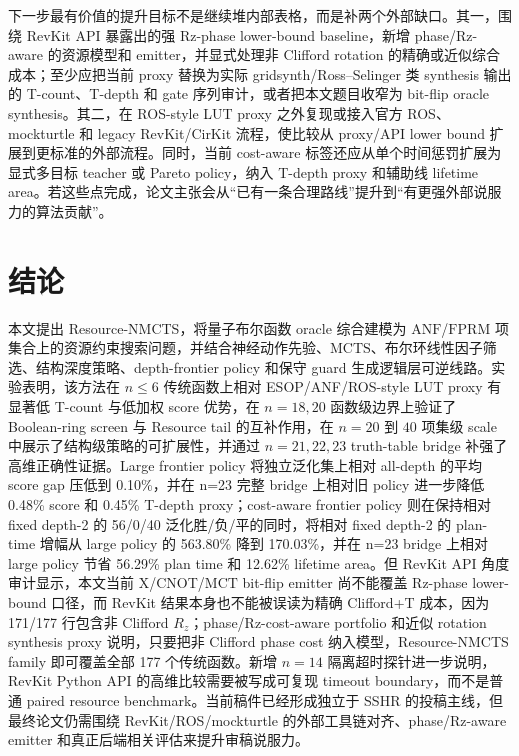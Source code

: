 \documentclass[UTF8,fontset=macnew,11pt]{ctexart}
\newcommand{\method}{Resource-NMCTS}
\newcommand{\screen}{Boolean-ring screen}
\newcommand{\anf}{\ensuremath{\mathrm{ANF}}}
\newcommand{\fprm}{\ensuremath{\mathrm{FPRM}}}
\newcommand{\mcts}{\ensuremath{\mathrm{MCTS}}}
\newcommand{\mct}{\ensuremath{\mathrm{MCT}}}
\begin{document}
下一步最有价值的提升目标不是继续堆内部表格，而是补两个外部缺口。其一，围绕 RevKit API 暴露出的强 Rz-phase lower-bound baseline，新增 phase/Rz-aware 的资源模型和 emitter，并显式处理非 Clifford rotation 的精确或近似综合成本；至少应把当前 proxy 替换为实际 gridsynth/Ross--Selinger 类 synthesis 输出的 T-count、T-depth 和 gate 序列审计，或者把本文题目收窄为 bit-flip oracle synthesis。其二，在 ROS-style LUT proxy 之外复现或接入官方 ROS、mockturtle 和 legacy RevKit/CirKit 流程，使比较从 proxy/API lower bound 扩展到更标准的外部流程。同时，当前 cost-aware 标签还应从单个时间惩罚扩展为显式多目标 teacher 或 Pareto policy，纳入 T-depth proxy 和辅助线 lifetime area。若这些点完成，论文主张会从“已有一条合理路线”提升到“有更强外部说服力的算法贡献”。

\section{结论}

本文提出 \method{}，将量子布尔函数 oracle 综合建模为 \anf{}/\fprm{} 项集合上的资源约束搜索问题，并结合神经动作先验、\mcts{}、布尔环线性因子筛选、结构深度策略、depth-frontier policy 和保守 guard 生成逻辑层可逆线路。实验表明，该方法在 $n\leq6$ 传统函数上相对 ESOP/ANF/ROS-style LUT proxy 有显著低 T-count 与低加权 score 优势，在 $n=18,20$ 函数级边界上验证了 \screen{} 与 Resource tail 的互补作用，在 $n=20$ 到 $40$ 项集级 scale 中展示了结构级策略的可扩展性，并通过 $n=21,22,23$ truth-table bridge 补强了高维正确性证据。Large frontier policy 将独立泛化集上相对 all-depth 的平均 score gap 压低到 0.10\%，并在 n=23 完整 bridge 上相对旧 policy 进一步降低 0.48\% score 和 0.45\% T-depth proxy；cost-aware frontier policy 则在保持相对 fixed depth-2 的 56/0/40 泛化胜/负/平的同时，将相对 fixed depth-2 的 plan-time 增幅从 large policy 的 563.80\% 降到 170.03\%，并在 n=23 bridge 上相对 large policy 节省 56.29\% plan time 和 12.62\% lifetime area。但 RevKit API 角度审计显示，本文当前 X/CNOT/\mct{} bit-flip emitter 尚不能覆盖 Rz-phase lower-bound 口径，而 RevKit 结果本身也不能被误读为精确 Clifford+T 成本，因为 171/177 行包含非 Clifford $R_z$；phase/Rz-cost-aware portfolio 和近似 rotation synthesis proxy 说明，只要把非 Clifford phase cost 纳入模型，Resource-NMCTS family 即可覆盖全部 177 个传统函数。新增 $n=14$ 隔离超时探针进一步说明，RevKit Python API 的高维比较需要被写成可复现 timeout boundary，而不是普通 paired resource benchmark。当前稿件已经形成独立于 SSHR 的投稿主线，但最终论文仍需围绕 RevKit/ROS/mockturtle 的外部工具链对齐、phase/Rz-aware emitter 和真正后端相关评估来提升审稿说服力。
\end{document}
